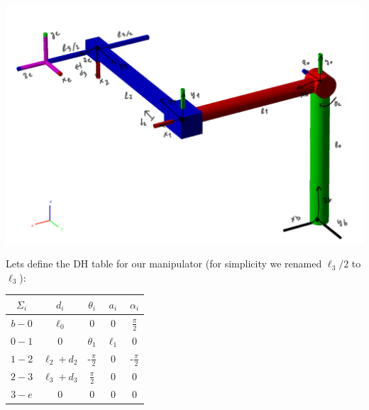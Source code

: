 \documentclass[a4paper,12pt]{article}
\renewcommand*{\t}{\theta}
\renewcommand*{\l}{\ell}
\begin{document}
\begin{center}
\includegraphics[scale=0.40,trim={10, 10, 10, 10},clip]{images/robot.png}
\end{center}

\noindent Lets define the DH table for our manipulator (for simplicity we renamed $\l_3/2$ to $\l_3$):

\begin{center}
\begin{tabular}{|c|c|c|c|c|}
    \hline
    $\Sigma_i$ & $d_i$ & $\theta_i$ & $a_i$ & $\alpha_i$ \\ 
    \hline
    $b-0$ & $\l_0$ &    $0$ &    $0$    & $\frac{\pi}{2}$ \\
    $0-1$ &    $0$    & $\t_1$ & $\l_1$ &        $0$ \\
    $1-2$ &    $\l_2+d_2$    & -$\frac{\pi}{2}$ & $0$ &        -$\frac{\pi}{2}$ \\
    $2-3$ &    $\l_3+d_3$ &    $\frac{\pi}{2}$ &    $0$    &        $0$ \\
    $3-e$ &    $0$    &    $0$ &    $0$    &        $0$ \\
    \hline
\end{tabular}
\end{center}
\end{document}

